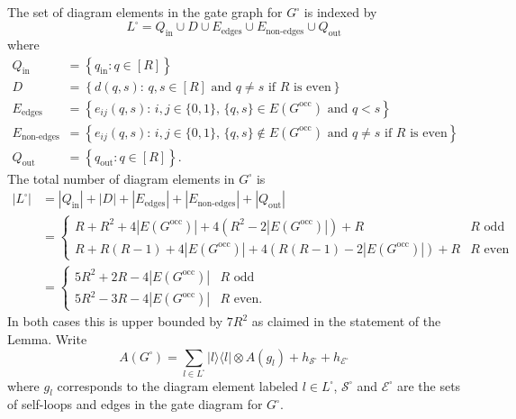 \documentclass[../thesis-main/thesis-main]{subfiles}
\begin{document}
The set of diagram elements in the gate graph for $G^{\square}$ is indexed by
\begin{equation}
L^{\square}=Q_{\text{in}}\cup D\cup E_{\text{edges}}\cup E_{\text{non-edges}}\cup Q_{\text{out}}\label{eq:L_square}
\end{equation}
where
\begin{align}
Q_{\text{in}} & =\left\{ q_{\mathrm{in}}:q\in[R]\right\} \label{eq:Q_in}\\
D & =\left\{ d(q,s):\, q,s\in[R]\text{ and }q\neq s\text{ if }R\text{ is even}\right\} \label{eq:defn_of D}\\
E_{\text{edges}} & =\left\{ e_{ij}(q,s):\, i,j\in\{0,1\},\,\{q,s\}\in E(G^{\text{occ}})\text{ and }q<s\right\} \nonumber \\
E_{\text{non-edges}} & =\left\{ e_{ij}(q,s):\, i,j\in\{0,1\},\,\{q,s\}\notin E(G^{\text{occ}})\text{ and }q\neq s\text{ if }R\text{ is even}\right\} \nonumber \\
Q_{\text{out}} & =\left\{ q_{\mathrm{out}}:q\in[R]\right\} .\label{eq:Q_out}
\end{align}
The total number of diagram elements in $G^{\square}$ is 
\begin{align}
|L^{\square}| & =|Q_{\text{in}}|+|D|+|E_{\text{edges}}|+|E_{\text{non-edges}}|+|Q_{\text{out}}|\\
 & =\begin{cases}
R+R^{2}+4|E(G^{\text{occ}})|+4\left(R^{2}-2|E(G^{\text{occ}})|\right)+R & R\text{ odd}\\
R+R\left(R-1\right)+4|E(G^{\text{occ}})|+4\left(R(R-1)-2|E(G^{\text{occ}})|\right)+R & R\text{ even}
\end{cases}\\
 & =\begin{cases}
5R^{2}+2R-4|E(G^{\text{occ}})| & R\text{ odd}\\
5R^{2}-3R-4|E(G^{\text{occ}})| & R\text{ even}.
\end{cases}
\end{align}
In both cases this is upper bounded by $7R^2$ as claimed in the statement of the Lemma. Write 
\begin{equation}
A(G^{\square})=\sum_{l\in L^{\square}}|l\rangle\langle l|\otimes A(g_{l})+h_{\mathcal{S}^{\square}}+h_{\mathcal{E}^{\square}}\label{eq:A_G_squAre}
\end{equation}
where $g_l$ corresponds to the diagram element labeled $l\in L^{\square}$, $\mathcal{S}^{\square}$ and $\mathcal{E}^{\square}$ are the sets of self-loops and edges in the gate diagram for $G^{\square}$. 
\end{document}
